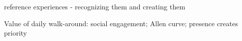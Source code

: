 reference experiences - recognizing them and creating them

Value of daily walk-around: 
social engagement; 
Allen curve; 
presence creates priority